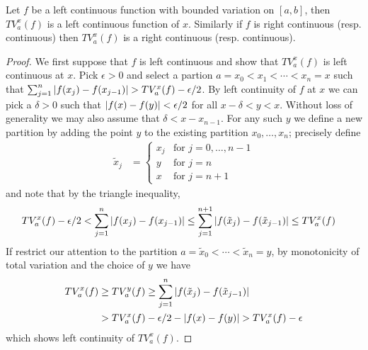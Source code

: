\begin{lem}\label{ContinuityOfTotalVariation}Let $f$ be a left
  continuous function with bounded variation on $[a,b]$, then
  $TV_a^x(f)$ is a left continuous function of $x$.  Similarly if $f$
  is right continuous (resp. continuous) then  $TV_a^x(f)$ is a right
  continuous (resp. continuous).
\end{lem}
\begin{proof}
We first suppose that $f$ is left continuous and show that $TV_a^x(f)$
is left continuous at $x$.  Pick $\epsilon > 0$ and select a partion
$a=x_0 < x_1 < \dotsb < x_n=x$ such that $\sum_{j=1}^n \left \vert f(x_j) -
  f(x_{j-1}) \right \vert > TV_a^x(f) - \epsilon/2$.  By left continuity of $f$ at $x$
we can pick a $\delta>0$ such that $\left \vert f(x) - f(y) \right \vert < \epsilon/2$
for all $x-\delta < y < x$. Without loss of generality we may also
assume that $\delta < x - x_{n-1}$.  For any such $y$ we
define a new partition by adding the point $y$ to the existing
partition $x_0, \dotsc, x_n$; precisely define 
\begin{align*}
\tilde{x}_j &= \begin{cases}
x_j & \text{for $j=0, \dotsc, n-1$} \\
y & \text{for $j=n$} \\
x & \text{for $j=n+1$}
\end{cases}
\end{align*}
and note that by the triangle inequality, 
\begin{align*}
TV_a^x(f) - \epsilon/2 &< \sum_{j=1}^n \left \vert f(x_j) -
  f(x_{j-1}) \right \vert \leq \sum_{j=1}^{n+1} \left \vert f(\tilde{x}_j) -
  f(\tilde{x}_{j-1}) \right \vert \leq TV_a^x(f)
\end{align*}
If restrict our attention to the partition $a = \tilde{x}_0 < \dotsb <
\tilde{x}_n = y$, by monotonicity of total variation and the choice of $y$ we have
\begin{align*}
TV_a^x(f) &\geq TV_a^y(f) \geq \sum_{j=1}^{n} \left \vert f(\tilde{x}_j) -
  f(\tilde{x}_{j-1}) \right \vert \\
&> TV_a^x(f) - \epsilon/2 - \left \vert f(x) - f(y) \right \vert > TV_a^x(f) - \epsilon
\end{align*}
which shows left continuity of $TV_a^x(f)$.


\end{proof}
